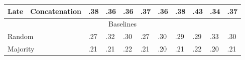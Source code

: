 \documentclass{article}
\begin{document}
\begin{table}[h]
\begin{tabular}{|lllllllllll|}
\multicolumn{1}{|l|}{Late}                   & \multicolumn{1}{l|}{Concatenation} & .38                & .36                & .36                & .37                & .36                & .38                & .43                & \multicolumn{1}{l|}{.34}                & .37                   \\ \hline
\multicolumn{11}{|c|}{Baselines}                                                                                                                                                                                                                                                                       \\ \hline
\multicolumn{2}{|l|}{Random}                                                      & .27                & .32                & .30                & .27                & .30                & .29                & .29                & \multicolumn{1}{l|}{.33}                & .30                   \\
\multicolumn{2}{|l|}{Majority}                                                    & .21                & .21                & .22                & .21                & .20                & .21                & .22                & \multicolumn{1}{l|}{.20}                & .21                   \\ \hline
\end{tabular}
\end{table}


\end{document}
